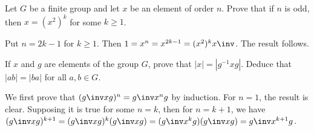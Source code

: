 \begin{problems}
\begin{sol}
    \end{sol}
    \item Let $G$ be a finite group and let $x$ be an element of order $n$. Prove that if $n$ is odd, then $x = (x^2)^k$ for some $k \geq 1$.
    \begin{sol}
        Put $n = 2k - 1$ for $k \geq 1$. Then $1 = x^n = x^{2k - 1} = (x^2)^kx\inv$. The result follows.
    \end{sol}
    \item \label{ex1.1.22} If $x$ and $g$ are elements of the group $G$, prove that $|x| = |g^{-1} x g|$. Deduce that $|ab| = |ba|$ for all $a, b \in G$.
    \begin{sol}
        We first prove that $(g\inv xg)^n = g\inv x^n g$ by induction. For $n = 1$, the result is clear. Supposing it is true for some $n = k$, then for $n = k + 1$, we have $(g\inv xg)^{k + 1} = (g \inv x g)^k(g\inv xg) = (g\inv x^kg)(g\inv x g) = g\inv x^{k + 1}g$.
        

\end{sol}
\end{problems}
